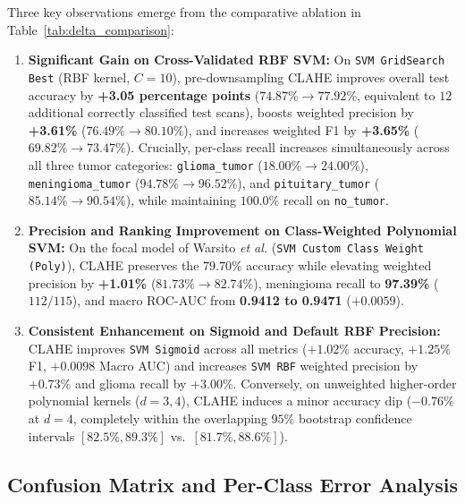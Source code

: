 \documentclass[conference]{IEEEtran}
\begin{document}
Three key observations emerge from the comparative ablation in Table~\ref{tab:delta_comparison}:
\begin{enumerate}
    \item \textbf{Significant Gain on Cross-Validated RBF SVM:} On \texttt{SVM GridSearch Best} (RBF kernel, $C=10$), pre-downsampling CLAHE improves overall test accuracy by \textbf{+3.05 percentage points} ($74.87\% \rightarrow 77.92\%$, equivalent to $12$ additional correctly classified test scans), boosts weighted precision by \textbf{+3.61\%} ($76.49\% \rightarrow 80.10\%$), and increases weighted F1 by \textbf{+3.65\%} ($69.82\% \rightarrow 73.47\%$). Crucially, per-class recall increases simultaneously across all three tumor categories: \texttt{glioma\_tumor} ($18.00\% \rightarrow 24.00\%$), \texttt{meningioma\_tumor} ($94.78\% \rightarrow 96.52\%$), and \texttt{pituitary\_tumor} ($85.14\% \rightarrow 90.54\%$), while maintaining $100.0\%$ recall on \texttt{no\_tumor}.
    \item \textbf{Precision and Ranking Improvement on Class-Weighted Polynomial SVM:} On the focal model of Warsito \emph{et al.} (\texttt{SVM Custom Class Weight (Poly)}), CLAHE preserves the $79.70\%$ accuracy while elevating weighted precision by \textbf{+1.01\%} ($81.73\% \rightarrow 82.74\%$), meningioma recall to \textbf{97.39\%} ($112/115$), and macro ROC-AUC from \textbf{0.9412 to 0.9471} ($+0.0059$).
    \item \textbf{Consistent Enhancement on Sigmoid and Default RBF Precision:} CLAHE improves \texttt{SVM Sigmoid} across all metrics ($+1.02\%$ accuracy, $+1.25\%$ F1, $+0.0098$ Macro AUC) and increases \texttt{SVM RBF} weighted precision by $+0.73\%$ and glioma recall by $+3.00\%$. Conversely, on unweighted higher-order polynomial kernels ($d=3, 4$), CLAHE induces a minor accuracy dip ($-0.76\%$ at $d=4$, completely within the overlapping $95\%$ bootstrap confidence intervals $[82.5\%, 89.3\%]$ vs.\ $[81.7\%, 88.6\%]$).
\end{enumerate}

\subsection{Confusion Matrix and Per-Class Error Analysis}
\end{document}
